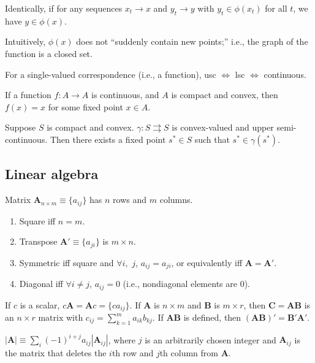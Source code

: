 \documentclass[8pt,letterpaper, landscape]{extarticle} %
\newcommand{\mA}{\ensuremath{\mathbf{A}}}
\newcommand{\mB}{\ensuremath{\mathbf{B}}}
\newcommand{\mC}{\ensuremath{\mathbf{C}}}
\begin{document}
\begin{multicols}{3}
\begin{description}
Identically, if for any sequences $ x_t \to x $ and $ y_t \to y $ with $ y_t \in \phi(x_t) $ for all $ t $, we have $ y \in \phi(x) $.

Intuitively, $ \phi (x) $ does not ``suddenly contain new points;'' i.e., the graph of the function is a closed set.

For a single-valued correspondence (i.e., a function), usc $ \iff $ lsc $ \iff $ continuous.

 If a function $ f \colon A \to A $ is continuous, and $ A $ is compact and convex, then $ f(x) = x $ for some fixed point $ x \in A $.

 Suppose $ S $ is compact and convex. $ \gamma \colon S \rightrightarrows S $ is convex-valued and upper semi-continuous. Then there exists a fixed point $ s^* \in S $ such that $ s^* \in \gamma(s^*) $.

\subsection{Linear algebra}
 Matrix $ \mA_{n \times m} \equiv \{ a_{ij} \} $ has $ n $ rows and $ m $ columns.
\begin{enumerate}
\item Square iff $ n = m $.
\item Transpose $ \mA' \equiv \{ a_{ji} \} $ is $ m \times n $.
\item Symmetric iff square and $ \forall i, $ $ j $, $ a_{ij} = a_{ji} $, or equivalently iff $ \mA = \mA' $.
\item Diagonal iff $ \forall i \neq j $, $ a_{ij} = 0 $ (i.e., nondiagonal elements are 0).
\end{enumerate}

If $ c $ is a scalar, $ c \mA = \mA c = \{ c a_{ij} \} $.
If $ \mA $ is $ n \times m $ and $ \mB $ is $ m \times r $, then $ \mC = \mA \mB $ is an $ n \times r $ matrix with $ c_{ij} = \sum_{k=1}^{m}a_{ik}b_{kj} $. If $ \mA \mB $ is defined, then $ ( \mA \mB )' = \mB' \mA' $.

 $ | \mA | \equiv \sum_{i} (-1)^{i+j} a_{ij} | \mA_{ij} | $, where $ j $ is an arbitrarily chosen integer and $ \mA_{ij} $ is the matrix that deletes the $ i $th row and $ j $th column from $ \mA $.


\end{description}
\end{multicols}
\end{document}
